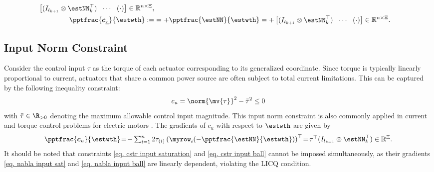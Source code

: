 \documentclass[lettersize,journal]{IEEEtran}
\begin{document}
\begin{appendices}
\begin{equation}
\begin{aligned}
\begin{bmatrix}
            (I_{l_{k+1}}\otimes \estNN_{k}^\top)&
            \!\cdots\! &
            (
                \cdot
            )
        \end{bmatrix} 
        \in
        \mathbb R^{n\times \Xi}
        , 
        \\
        \pptfrac{\boldsymbol c_{\underline\tau}}{\estwth}         
        :=
        & 
        = 
        +\pptfrac{\estNN}{\estwth}
        =
        +\begin{bmatrix}
            (I_{l_{k+1}}\otimes \estNN_{k}^\top)&
            \!\cdots\! &
            (
                \cdot
            )
        \end{bmatrix} 
        \in
        \mathbb R^{n\times \Xi}
        .
    \end{aligned}
    \label{eq. nabla input sat}
\end{equation}

\subsection{Input Norm Constraint}\label{sec:appen:input_norm_cstr}

Consider the control input $\tau$ as the torque of each actuator corresponding to its generalized coordinate. Since torque is typically linearly proportional to current, actuators that share a common power source are often subject to total current limitations. This can be captured by the following inequality constraint: 
\begin{equation}
    c_{u}=\norm{\mv{\tau}}^2 -\bar\tau^2  \le 0
    \label{eq. cstr input ball}
\end{equation}
with $\bar\tau\in\R_{>0}$ denoting the maximum allowable control input magnitude. This input norm constraint is also commonly applied in current and torque control problems for electric motors \cite{Choi:2024aa}.
The gradients of $c_{u}$ with respect to $\estwth$ are given by
\begin{equation}
    \pptfrac{\boldsymbol c_{u}}{\estwth}
    \!=\! 
    -\textstyle\sum_{i=1}^n 2\tau_{(i)} 
    \left(
        \myrow_i
        (
            -\pptfrac{\estNN}{\estwth}
        )
    \right)^\top  
    \!=\! 
    \tau^\top (I_{l_{k+1}}\otimes \estNN_k^\top)
    \in \mathbb R^{\Xi}.
    \label{eq. nabla input ball}
\end{equation}
It should be noted that constraints \eqref{eq. cstr input saturation} and \eqref{eq. cstr input ball} cannot be imposed simultaneously, as their gradients \eqref{eq. nabla input sat} and \eqref{eq. nabla input ball} are linearly dependent, violating the LICQ condition.


\end{appendices}
\end{document}
